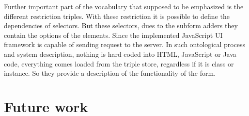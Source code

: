 Further important part of the vocabulary that supposed to be emphasized is the different restriction triples. With these restriction it is possible to define the dependencies of selectors. But these selectors, dues to the subform adders they contain the options of the elements. Since the implemented JavaScript UI framework is capable of sending request to the server. In such ontological process and system description, nothing is hard coded into HTML, JavaScript or Java code, everything comes loaded from the triple store, regardless if it is class or instance. So they provide a description of the functionality of the form. 


\section{Future work}

